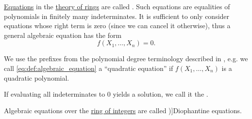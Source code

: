 \begin{definition}\label{def:algebraic_equation}\mimprovised
  \hyperref[def:first_order_equation]{Equations} in the \hyperref[def:ring/theory]{theory of rings} are called . Such equations are equalities of polynomials in finitely many indeterminates. It is sufficient to only consider equations whose right term is zero (since we can cancel it otherwise), thus a general algebraic equation has the form
  \begin{equation*}\label{eq:def:algebraic_equation}
    f(X_1, \ldots, X_n) = 0.
  \end{equation*}

  We use the prefixes from the polynomial degree terminology described in , e.g. we call \eqref{eq:def:algebraic_equation} a \enquote{quadratic equation} if \( f(X_1, \ldots, X_n) \) is a quadratic polynomial.

  \begin{thmenum}
     If evaluating all indeterminates to \( 0 \) yields a solution, we call it the .

     Algebraic equations over the \hyperref[def:ring_of_integers]{ring of integers} are called \term[ru=Диофантово уравнение (\cite[\S 1.9]{ШеньВерещагин2017Вычислимость})]{Diophantine equations}.
  \end{thmenum}
\end{definition}

